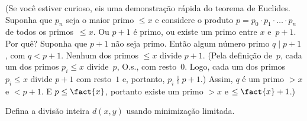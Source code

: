 \documentclass[../../../include/open-logic-section]{subfiles}
\begin{document}
(Se você estiver curioso, eis uma demonstração rápida do teorema de
Euclides. Suponha que $p_n$ seja o maior primo $\le x$ e considere o
produto $p = p_0\cdot p_1 \cdot \dots \cdot p_n$ de todos os
primos~$\le x$. Ou $p+1$ é primo, ou existe um primo entre $x$
e~$p+1$. Por quê? Suponha que $p+1$ não seja primo. Então algum número
primo $q \mid p+1$, com $q < p+1$. Nenhum dos primos $\le x$ divide
$p+1$. (Pela definição de~$p$, cada um dos primos $p_i \le x$
divide~$p$, O.s.\@, com resto~$0$. Logo, cada um dos primos
$p_i \le x$ divide $p+1$ com resto~$1$ e, portanto,
$p_i \nmid p+1$.) Assim, $q$ é um primo $> x$ e $< p+1$. E
$p \le \fact{x}$, portanto existe um primo $> x$ e $\le
\fact{x}+1$.)

\begin{prob}
Defina a divisão inteira $d(x, y)$ usando minimização limitada.
\end{prob}
\end{document}
